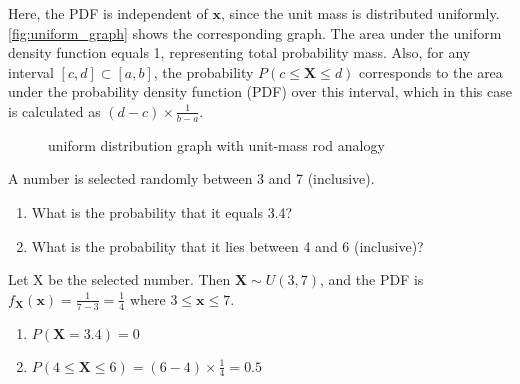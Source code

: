 Here, the PDF is independent of \( \bm{x} \), since the unit mass is distributed uniformly.
\autoref{fig:uniform_graph} shows the corresponding graph.
The area under the uniform density function equals 1, representing total probability mass.
Also, for any interval \( [c, d] \subset [a, b] \),
the probability \( P(c \leq \bm{X} \leq d) \) corresponds to the area under the probability density function (PDF) over this interval,
which in this case is calculated as \( (d - c) \times \frac{1}{b - a} \).
\begin{figure}[t]
\begin{center}
\end{center}
\caption{uniform distribution graph with unit-mass rod analogy}
\label{fig:uniform_graph}
\end{figure}

\begin{exmp}
    A number is selected randomly between 3 and 7 (inclusive).
    \begin{enumerate}
        \item What is the probability that it equals 3.4?
        \item What is the probability that it lies between 4 and 6 (inclusive)?
    \end{enumerate}
\end{exmp}
\begin{solution}
    Let X be the selected number.
    Then \( \bm{X} \sim U(3, 7) \),
    and the PDF is \( f_{\bm{X}}(\bm{x}) = \frac{1}{7 - 3} = \frac{1}{4} \) where \( 3 \leq \bm{x} \leq 7 \).
    \begin{enumerate}
        \item \( P(\bm{X} = 3.4) = 0 \)
        \item \( P(4 \leq \bm{X} \leq 6) = (6 - 4) \times \frac{1}{4} = 0.5 \)
    \end{enumerate}
\end{solution}
